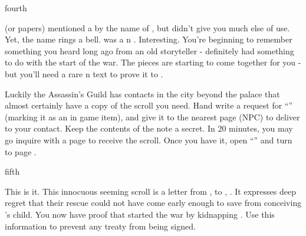 \documentclass[greennotebook]{NeptuneBall}
\begin{document}
\begin{page}{fourth}

\cManta{} (or \cManta{\their} papers) mentioned a \cMother{\mer} by the name of \cMother{}, but didn't give you much else of use. Yet, the name rings a bell. \cMother{} was a \pPacifica{}n \cMother{\prince}. Interesting. You're beginning to remember something you heard long ago from an old storyteller - \cMother{} definitely had something to do with the start of the war. The pieces are starting to come together for you - but you'll need a rare \pPacifica{}n text to prove it to \cPrince{}.

Luckily the Assassin's Guild has contacts in the city beyond the palace that almost certainly have a copy of the scroll you need. Hand write a request for ``\iScroll{}'' (marking it as an in game item), and give it to the nearest page (NPC) to deliver to your contact. Keep the contents of the note a secret. In 20 minutes, you may go inquire with a page to receive the scroll. Once you have it, open ``\iScroll{}'' and turn to page .

\end{page}

\begin{page}{fifth}

This is it. This innocuous seeming scroll is a letter from \cMotherBrother{\prince} \cMotherBrother{}, to \cMotherBrother{\their} \cMother{\sibling}, \cMother{\prince} \cMother{}. It expresses \cMotherBrother{\their} deep regret that their rescue could not have come early enough to save \cMother{} from conceiving \cExExKing{}'s child. You now have proof that \pAtlantis{} started the war by kidnapping \cMother{\prince} \cMother{}. Use this information to prevent any treaty from being signed.

\end{page}

\endnotebook
\end{document}
